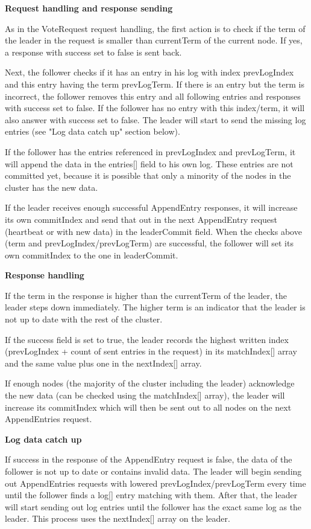 \textbf{Request handling and response sending}

As in the VoteRequest request handling, the first action is to check if the term of the
leader in the request is smaller than currentTerm of the current node. If yes, a response with success
set to false is sent back.

Next, the follower checks if it has an entry in his log with index prevLogIndex and this entry having the term prevLogTerm.
If there is an entry but the term is incorrect, the follower removes this entry and all following entries and responses
with success set to false. If the follower has no entry with this index/term, it will also answer with success set to false.
The leader will start to send the missing log entries (see "Log data catch up" section below).

If the follower has the entries referenced in prevLogIndex and prevLogTerm, it will append the data in the entries[] field to his
own log. These entries are not committed yet, because it is possible that only a minority of the nodes in the cluster has the new data.

If the leader receives enough successful AppendEntry responses, it will increase its own commitIndex and send that out in the next AppendEntry request (heartbeat or with new data) in the leaderCommit field. When the checks above (term and prevLogIndex/prevLogTerm) are successful, the follower will set its own commitIndex to the one in leaderCommit.

\textbf{Response handling}

If the term in the response is higher than the currentTerm of the leader, the leader steps down immediately. The higher term
is an indicator that the leader is not up to date with the rest of the cluster.

If the success field is set to true, the leader records the highest written index (prevLogIndex + count of sent entries in the request) in its matchIndex[] array and
the same value plus one in the nextIndex[] array.

If enough nodes (the majority of the cluster including the leader) acknowledge the new data (can be checked using the matchIndex[] array), the leader will increase its commitIndex which will then be sent out to all nodes on the next AppendEntries request.

\textbf{Log data catch up}

If success in the response of the AppendEntry request is false, the data of the follower is not up to date or contains invalid data. The leader will begin sending out AppendEntries requests with lowered prevLogIndex/prevLogTerm every time until the follower finds a log[] entry matching with them. After that, the leader will start sending out log entries until the follower has the exact same log as the leader. This process uses the nextIndex[] array on the leader.





